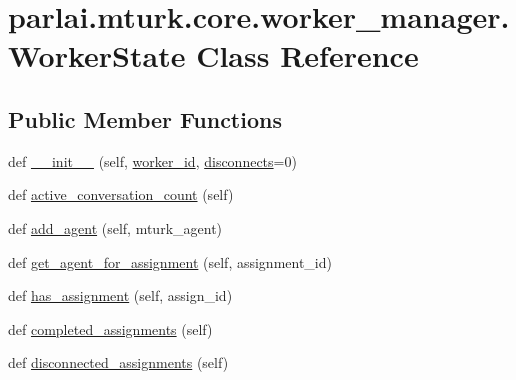 \hypertarget{classparlai_1_1mturk_1_1core_1_1worker__manager_1_1WorkerState}{}\section{parlai.\+mturk.\+core.\+worker\+\_\+manager.\+Worker\+State Class Reference}
\label{classparlai_1_1mturk_1_1core_1_1worker__manager_1_1WorkerState}
\subsection*{Public Member Functions}
\begin{DoxyCompactItemize}
\item 
def \hyperlink{classparlai_1_1mturk_1_1core_1_1worker__manager_1_1WorkerState_a93ec8410562403157cbf3ac4199761ac}{\+\_\+\+\_\+init\+\_\+\+\_\+} (self, \hyperlink{classparlai_1_1mturk_1_1core_1_1worker__manager_1_1WorkerState_a5cb2de9dfc1d8d0b07f693a9e6fabe72}{worker\+\_\+id}, \hyperlink{classparlai_1_1mturk_1_1core_1_1worker__manager_1_1WorkerState_ab751a2c9f79305a2db1439cd9449006a}{disconnects}=0)
\item 
def \hyperlink{classparlai_1_1mturk_1_1core_1_1worker__manager_1_1WorkerState_adf199dbdc37d1a6a00365b31632f30d0}{active\+\_\+conversation\+\_\+count} (self)
\item 
def \hyperlink{classparlai_1_1mturk_1_1core_1_1worker__manager_1_1WorkerState_aa9680796261d0a48686474fb44741032}{add\+\_\+agent} (self, mturk\+\_\+agent)
\item 
def \hyperlink{classparlai_1_1mturk_1_1core_1_1worker__manager_1_1WorkerState_ab258d81b68825e049f236cbb8352a126}{get\+\_\+agent\+\_\+for\+\_\+assignment} (self, assignment\+\_\+id)
\item 
def \hyperlink{classparlai_1_1mturk_1_1core_1_1worker__manager_1_1WorkerState_ac2dd663b0b95b39c915e8198d825b84c}{has\+\_\+assignment} (self, assign\+\_\+id)
\item 
def \hyperlink{classparlai_1_1mturk_1_1core_1_1worker__manager_1_1WorkerState_ae38b2ad12b9cf5282bb025d3b60e7e61}{completed\+\_\+assignments} (self)
\item 
def \hyperlink{classparlai_1_1mturk_1_1core_1_1worker__manager_1_1WorkerState_a0cfe653c2c2df23393da636c3106a3de}{disconnected\+\_\+assignments} (self)
\end{DoxyCompactItemize}
